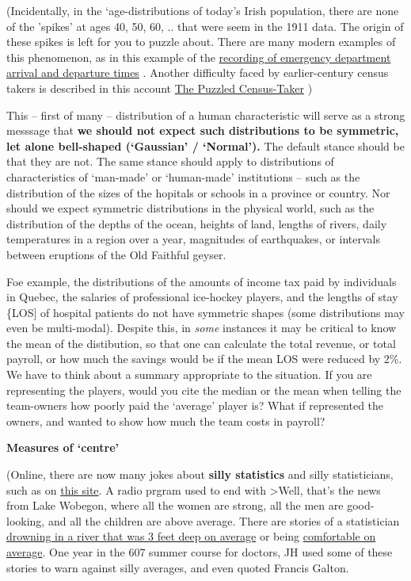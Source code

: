 \documentclass[]{book}
\begin{document}
(Incidentally, in the `age-distributions of today's Irish population, there are none of the 'spikes' at ages 40, 50, 60, .. that were seem in the 1911 data. The origin of these spikes is left for you to puzzle about. There are many modern examples of this phenomenon, as in this example of the \href{http://www.medicine.mcgill.ca/epidemiology/hanley/bios601/ch-chapterPlusNotes-ch3-2019.pdf\#page=21}{recording of emergency department arrival and departure times} . Another difficulty faced by earlier-century census takers is described in this account
\href{https://books.google.ca/books?id=fUsPAAAAYAAJ\&pg=PA118\&dq=John+Godfrey+Saxe+census-taker\&hl=en\&sa=X\&ved=0ahUKEwjQv6f04OvVAhUL5IMKHUZfBfgQ6AEIJjAA\#v=onepage\&q=John\%20Godfrey\%20Saxe\%20census-taker\&f=false}{The Puzzled Census-Taker} )

This -- first of many -- distribution of a human characteristic will serve as a strong messsage that \textbf{we should not expect such distributions to be symmetric, let alone bell-shaped (`Gaussian' / `Normal').} The default stance should be that they are not. The same stance should apply to distributions of characteristics of `man-made' or `human-made' institutions -- such as the distribution of the sizes of the hopitals or schools in a province or country. Nor should we expect symmetric distributions in the physical world, such as the distribution of the depths of the ocean, heights of land, lengths of rivers, daily temperatures in a region over a year, magnitudes of earthquakes, or intervals between eruptions of the Old Faithful geyser.

Foe example, the distributions of the amounts of income tax paid by individuals in Quebec, the salaries of professional ice-hockey players, and the lengths of stay \{LOS{]} of hospital patients do not have symmetric shapes (some distributions may even be multi-modal). Despite this, in \emph{some} instances it may be critical to know the mean of the distibution, so that one can calculate the total revenue, or total payroll, or how much the savings would be if the mean LOS were reduced by 2\%.
We have to think about a summary appropriate to the situation. If you are representing the players, would you cite the median or the mean when telling the team-owners how poorly paid the `average' player is? What if represented the owners, and wanted to show how much the team costs in payroll?

\textbf{Measures of `centre'}

(Online, there are now many jokes about \textbf{silly statistics} and silly statisticians, such as on \href{http://www.workjoke.com/statisticians-jokes.html}{this site}.
A radio prgram used to end with
\textgreater{}Well, that's the news from Lake Wobegon, where all the women are strong, all the men are good-looking, and all the children are above average.
There are stories of a statistician \href{https://ask.metafilter.com/261337/Source-of-well-known-joke-about-statisticians}{drowning in a river that was 3 feet deep on
average}
or being \href{https://www.barrypopik.com/index.php/new_york_city/entry/head_in_the_oven_feet_in_the_freezer}{comfortable on average}. One year in the 607 summer course for doctors, JH used some of these stories to warn against silly averages, and even quoted Francis Galton.
\end{document}
